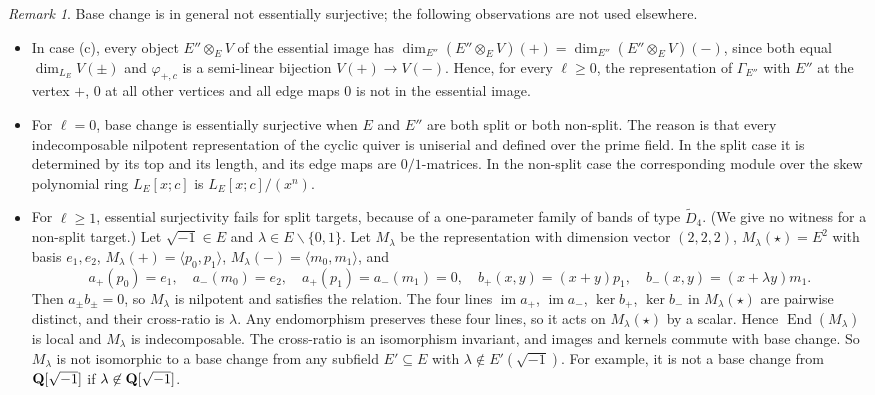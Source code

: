 \documentclass[a4paper,12pt,reqno]{amsart}
\newcommand{\QQ}{{\rm\bf Q}}
\DeclareMathOperator{\End}{\mathrm{End}}
\theoremstyle{plain}
\theoremstyle{remark}
\newtheorem{remark}[theorem]{Remark}
\begin{document}
    \begin{remark}\label{rmk:basechangeES}
      Base change is in general not essentially surjective; the following observations are not used elsewhere.
      \begin{itemize}
      \item In case (c), every object $E''\otimes_EV$ of the essential image has $\dim_{E''}(E''\otimes_EV)(+)=\dim_{E''}(E''\otimes_EV)(-)$, since both equal $\dim_{L_E}V(\pm)$ and $\varphi_{+,c}$ is a semi-linear bijection $V(+)\to V(-)$. Hence, for every $\ell\geq0$, the representation of $\Gamma_{E''}$ with $E''$ at the vertex $+$, $0$ at all other vertices and all edge maps $0$ is not in the essential image.
      \item For $\ell=0$, base change is essentially surjective when $E$ and $E''$ are both split or both non-split. The reason is that every indecomposable nilpotent representation of the cyclic quiver is uniserial and defined over the prime field. In the split case it is determined by its top and its length, and its edge maps are $0/1$-matrices. In the non-split case the corresponding module over the skew polynomial ring $L_E[x;c]$ is $L_E[x;c]/(x^n)$.
      \item For $\ell\geq1$, essential surjectivity fails for split targets, because of a one-parameter family of bands of type $\widetilde{D}_4$. (We give no witness for a non-split target.) Let $\sqrt{-1}\in E$ and $\lambda\in E\smallsetminus\{0,1\}$. Let $M_\lambda$ be the representation with dimension vector $(2,2,2)$, $M_\lambda(\star)=E^2$ with basis $e_1,e_2$, $M_\lambda(+)=\langle p_0,p_1\rangle$, $M_\lambda(-)=\langle m_0,m_1\rangle$, and
      \[
        a_+(p_0)=e_1,\quad a_-(m_0)=e_2,\quad a_+(p_1)=a_-(m_1)=0,\quad b_+(x,y)=(x+y)p_1,\quad b_-(x,y)=(x+\lambda y)m_1.
      \]
      Then $a_\pm b_\pm=0$, so $M_\lambda$ is nilpotent and satisfies the relation. The four lines $\operatorname{im}a_+$, $\operatorname{im}a_-$, $\ker b_+$, $\ker b_-$ in $M_\lambda(\star)$ are pairwise distinct, and their cross-ratio is $\lambda$. Any endomorphism preserves these four lines, so it acts on $M_\lambda(\star)$ by a scalar. Hence $\End(M_\lambda)$ is local and $M_\lambda$ is indecomposable. The cross-ratio is an isomorphism invariant, and images and kernels commute with base change. So $M_\lambda$ is not isomorphic to a base change from any subfield $E'\subseteq E$ with $\lambda\not\in E'(\sqrt{-1})$. For example, it is not a base change from $\QQ[\sqrt{-1}]$ if $\lambda\not\in\QQ[\sqrt{-1}]$.
      \end{itemize}
    \end{remark}
\end{document}
